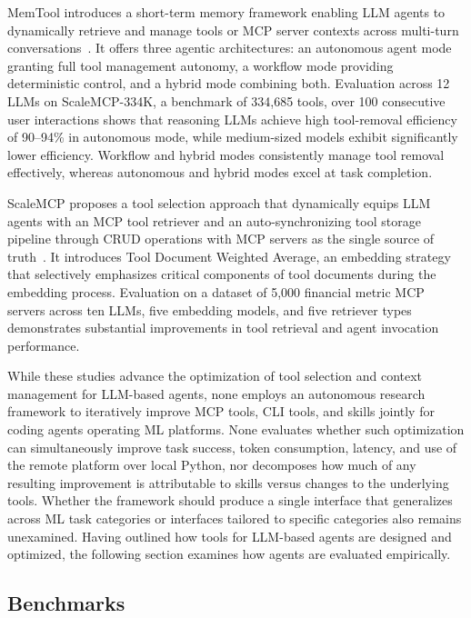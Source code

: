 \documentclass[
english,                 %
bibtex,                  %
includeExtraAbstracts, %
]{kththesis}
\numberwithin{listing}{chapter}
\begin{document}
MemTool introduces a short-term memory framework enabling \gls{LLM} agents to dynamically retrieve and manage tools or \gls{MCP} server contexts across multi-turn conversations~\cite{campos_memtool_2026}. It offers three agentic architectures: an autonomous agent mode granting full tool management autonomy, a workflow mode providing deterministic control, and a hybrid mode combining both. Evaluation across 12 \glspl{LLM} on Scale\gls{MCP}-334K, a benchmark of 334,685 tools, over 100 consecutive user interactions shows that reasoning \glspl{LLM} achieve high tool-removal efficiency of 90--94\% in autonomous mode, while medium-sized models exhibit significantly lower efficiency. Workflow and hybrid modes consistently manage tool removal effectively, whereas autonomous and hybrid modes excel at task completion.

ScaleMCP proposes a tool selection approach that dynamically equips \gls{LLM} agents with an \gls{MCP} tool retriever and an auto-synchronizing tool storage pipeline through CRUD operations with \gls{MCP} servers as the single source of truth~\cite{v_scaling_2025}. It introduces Tool Document Weighted Average, an embedding strategy that selectively emphasizes critical components of tool documents during the embedding process. Evaluation on a dataset of 5,000 financial metric \gls{MCP} servers across ten \glspl{LLM}, five embedding models, and five retriever types demonstrates substantial improvements in tool retrieval and agent invocation performance.

While these studies advance the optimization of tool selection and context management for \gls{LLM}-based agents, none employs an autonomous research framework to iteratively improve \gls{MCP} tools, \gls{CLI} tools, and skills jointly for coding agents operating \gls{ML} platforms. None evaluates whether such optimization can simultaneously improve task success, token consumption, latency, and use of the remote platform over local Python, nor decomposes how much of any resulting improvement is attributable to skills versus changes to the underlying tools. Whether the framework should produce a single interface that generalizes across \gls{ML} task categories or interfaces tailored to specific categories also remains unexamined. Having outlined how tools for \gls{LLM}-based agents are designed and optimized, the following section examines how agents are evaluated empirically.

\subsection{Benchmarks}
\end{document}
